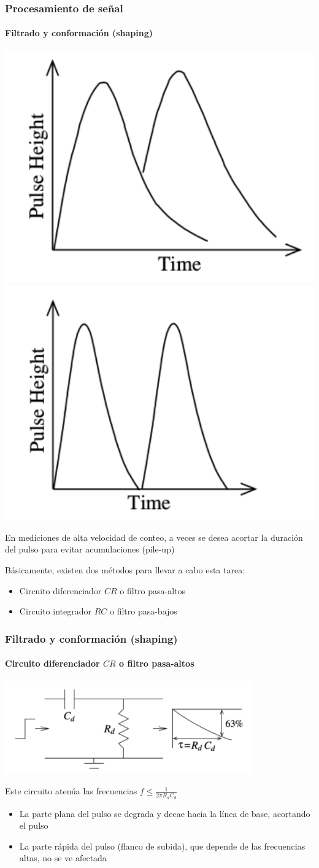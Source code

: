 \documentclass{beamer}
\begin{document}
\begin{frame}
\frametitle{Procesamiento de señal}
\framesubtitle{Filtrado y conformación (shaping)}
\begin{center}
\includegraphics[width=.4\textwidth]{d2/pileup_not_corrected} 
\includegraphics[width=.4\textwidth]{d2/pileup_corrected} 
\end{center}

En mediciones de alta velocidad de conteo, a veces se desea acortar la duración 
del pulso para evitar acumulaciones ({\color{blue}pile-up})

Básicamente, existen dos métodos para llevar a cabo esta tarea:
\begin{itemize}
\item Circuito diferenciador $CR$ o filtro pasa-altos
\item Circuito integrador $RC$ o filtro pasa-bajos
\end{itemize}
\end{frame}

\begin{frame}
\frametitle{Filtrado y conformación (shaping)}
\framesubtitle{{\color{blue}Circuito diferenciador $CR$ o filtro pasa-altos}}
\begin{center}
\includegraphics[width=0.8\textwidth]{d2/cr_differentiator2}
\end{center}
Este circuito atenúa las frecuencias $f \leq \frac{1}{2\pi R_dC_d}$
\begin{itemize}
\item \alert{La parte plana del pulso se degrada y decae hacia la línea de base, 
acortando el pulso}
\item \alert{La parte rápida del pulso (flanco de subida), que depende de las 
frecuencias altas, no se ve afectada}
\end{itemize}
\end{frame}
\end{document}
